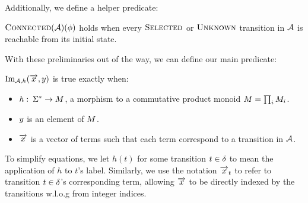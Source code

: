 \documentclass[runningheads]{llncs}
\begin{document}
  Additionally, we define a helper predicate:

  \begin{definition}
    $\operatorname{\textsc{Connected}}(\mathcal{A})(\phi)$ holds when every $\operatorname{\textsc{Selected}}$ or $\operatorname{\textsc{Unknown}}$ transition in $\mathcal{A}$ is reachable from its initial state.
  \end{definition}

  With these preliminaries out of the way, we can define our main predicate:

\begin{definition}
$\operatorname{Im}_{\mathcal{A}, h}(\overrightarrow{x}, y)$ is true exactly when:
\begin{itemize}
\item $h:\: \Sigma^* \rightarrow M$, a morphism to a commutative product monoid $M = \prod_{i} M_i$.
\item $y$ is an element of $M$.
\item $\overrightarrow{x}$ is a vector of terms such that each term correspond to a
  transition in $\mathcal{A}$.
\end{itemize}
\end{definition}

To simplify equations, we let $h(t)$ for some transition $t \in \delta$ to
mean the application of $h$ to $t$'s label. Similarly, we use the notation
$\overrightarrow{x}_t$ to refer to transition $t \in \delta$'s corresponding
term, allowing $\overrightarrow{x}$ to be directly indexed by the transitions
w.l.o.g from integer indices.
  
\end{document}
